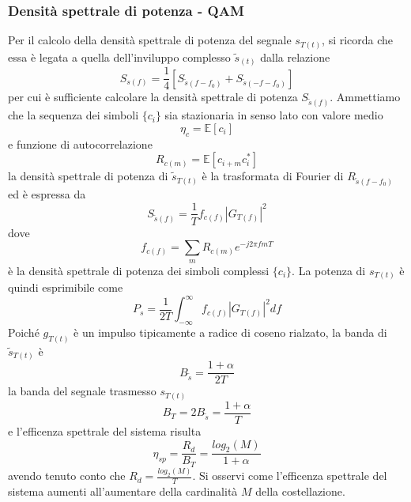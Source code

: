         \subsubsection{Densità spettrale di potenza - QAM}
            Per il calcolo della densità spettrale di potenza del segnale $s_{T(t)}$, si ricorda che essa è legata a quella dell'inviluppo
            complesso $\tilde{s}_{(t)}$ dalla relazione
            \[
                S_{s(f)} = \frac{1}{4}\left[S_{\tilde{s}{(f-f_0)}}+ S_{\tilde{s}{(-f-f_0)}}\right]    
            \]
            per cui è sufficiente calcolare la densità spettrale di potenza $S_{\tilde{s}(f)}$. Ammettiamo che la sequenza dei 
            simboli $\{c_i\}$ sia stazionaria in senso lato con valore medio 
            \[
                \eta_c=\mathbb{E}[c_i]    
            \] 
            e funzione di autocorrelazione
            \[
                R_{c(m)} = \mathbb{E}[c_{i+m}c^\ast_i]    
            \]
            la densità spettrale di potenza di $\tilde{s}_{T(t)}$ è la trasformata di Fourier di $R_{\tilde{s}{(f-f_0)}}$ ed è espressa da
            \[
                S_{\tilde{s}{(f)}} = \frac{1}{T} f_{c(f)}\left|G_{T(f)}\right|^2    
            \]
            dove 
            \[
                f_{c(f)} = \sum_{m}R_{c(m)}e^{-j2\pi fmT}
            \]
            è la densità spettrale di potenza dei simboli complessi $\{c_i\}$. La potenza di $s_{T(t)}$ è quindi esprimibile come
            \[
                P_s=\frac{1}{2T} \int_{-\infty}^{\infty} f_{c(f)} \left|G_{T(f)}\right|^2 df
            \]
            Poiché $g_{T(t)}$ è un impulso tipicamente a radice di coseno rialzato, la banda di $\tilde{s}_{T(t)}$ è 
            \[
                B_{\tilde{s}}=\frac{1+\alpha}{2T}    
            \]
            la banda del segnale trasmesso $s_{T(t)}$ 
            \[
                B_{T}=2B_{\tilde{s}} =\frac{1+\alpha}{T}
            \]
            e l'efficenza spettrale del sistema risulta 
            \[
                \eta_{sp} = \frac{R_d}{B_T} = \frac{log_2(M)}{1+\alpha} 
            \]
            avendo tenuto conto che $R_d = \frac{log_2(M)}{T}$. Si osservi come l'efficenza spettrale del sistema aumenti all'aumentare 
            della cardinalità $M$ della costellazione.
